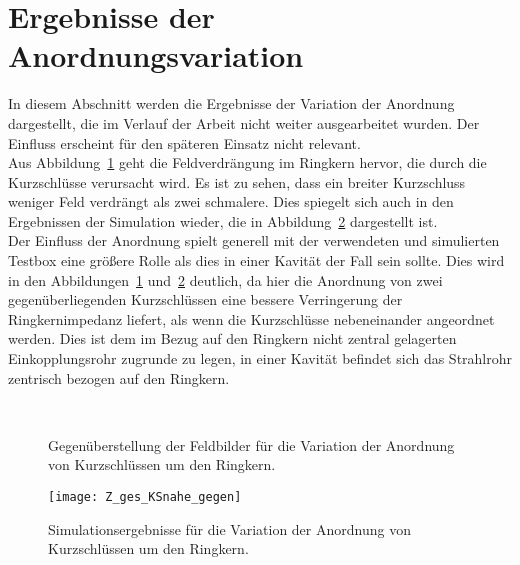 \section{Ergebnisse der Anordnungsvariation}\label{anhang:Anordnung}
In diesem Abschnitt werden die Ergebnisse der Variation der Anordnung dargestellt, die im Verlauf der Arbeit nicht weiter ausgearbeitet wurden. Der Einfluss erscheint für den späteren Einsatz nicht relevant.\\
Aus Abbildung~\ref{fig:fieldAnordnung} geht die Feldverdrängung im Ringkern hervor, die durch die Kurzschlüsse verursacht wird. Es ist zu sehen, dass ein breiter Kurzschluss weniger Feld verdrängt als zwei schmalere. Dies spiegelt sich auch in den Ergebnissen der Simulation wieder, die in Abbildung~\ref{fig:simAnordnung} dargestellt ist.\\
Der Einfluss der Anordnung spielt generell mit der verwendeten und simulierten Testbox eine größere Rolle als dies in einer Kavität der Fall sein sollte. Dies wird in den Abbildungen~\ref{fig:fieldAnordnung} und~\ref{fig:simAnordnung} deutlich, da hier die Anordnung von zwei gegenüberliegenden Kurzschlüssen eine bessere Verringerung der Ringkernimpedanz liefert, als wenn die Kurzschlüsse nebeneinander angeordnet werden. Dies ist dem im Bezug auf den Ringkern nicht zentral gelagerten Einkopplungsrohr zugrunde zu legen, in einer Kavität befindet sich das Strahlrohr zentrisch bezogen auf den Ringkern.

\begin{figure}[htb]
    \centering
    \\
    \caption{Gegen\"uberstellung der Feldbilder für die Variation der Anordnung von Kurzschlüssen um den Ringkern.}
    \label{fig:fieldAnordnung}
\end{figure}

\begin{figure}[htb]
    \centering
    \texttt{[image: Z\_ges\_KSnahe\_gegen]}
    \caption{Simulationsergebnisse für die Variation der Anordnung von Kurzschlüssen um den Ringkern.}
    \label{fig:simAnordnung}
\end{figure}
